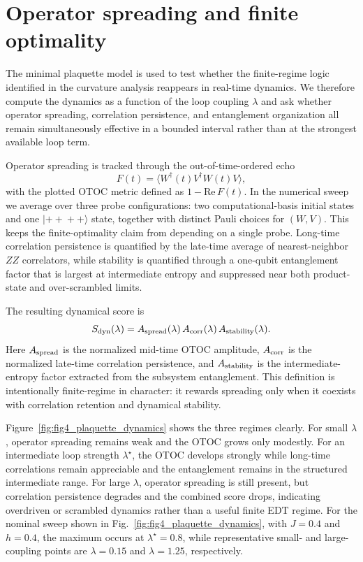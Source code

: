 \section{Operator spreading and finite optimality}

The minimal plaquette model is used to test whether the finite-regime logic identified in the curvature analysis reappears in real-time dynamics. We therefore compute the dynamics as a function of the loop coupling $\lambda$ and ask whether operator spreading, correlation persistence, and entanglement organization all remain simultaneously effective in a bounded interval rather than at the strongest available loop term.

Operator spreading is tracked through the out-of-time-ordered echo
\begin{equation}
F(t)
=
\langle W^\dagger(t)V^\dagger W(t)V\rangle,
\end{equation}
with the plotted OTOC metric defined as $1-\mathrm{Re}\,F(t)$. In the numerical sweep we average over three probe configurations: two computational-basis initial states and one $|+\!+\!+\!+\rangle$ state, together with distinct Pauli choices for $(W,V)$. This keeps the finite-optimality claim from depending on a single probe. Long-time correlation persistence is quantified by the late-time average of nearest-neighbor $ZZ$ correlators, while stability is quantified through a one-qubit entanglement factor that is largest at intermediate entropy and suppressed near both product-state and over-scrambled limits.

The resulting dynamical score is
\begin{equation}
S_{\rm dyn}(\lambda)
=
A_{\rm spread}(\lambda)\,
A_{\rm corr}(\lambda)\,
A_{\rm stability}(\lambda).
\end{equation}
Here $A_{\rm spread}$ is the normalized mid-time OTOC amplitude, $A_{\rm corr}$ is the normalized late-time correlation persistence, and $A_{\rm stability}$ is the intermediate-entropy factor extracted from the subsystem entanglement. This definition is intentionally finite-regime in character: it rewards spreading only when it coexists with correlation retention and dynamical stability.

Figure~\ref{fig:fig4_plaquette_dynamics} shows the three regimes clearly. For small $\lambda$, operator spreading remains weak and the OTOC grows only modestly. For an intermediate loop strength $\lambda^\star$, the OTOC develops strongly while long-time correlations remain appreciable and the entanglement remains in the structured intermediate range. For large $\lambda$, operator spreading is still present, but correlation persistence degrades and the combined score drops, indicating overdriven or scrambled dynamics rather than a useful finite EDT regime. For the nominal sweep shown in Fig.~\ref{fig:fig4_plaquette_dynamics}, with $J=0.4$ and $h=0.4$, the maximum occurs at $\lambda^\star = 0.8$, while representative small- and large-coupling points are $\lambda = 0.15$ and $\lambda = 1.25$, respectively.

